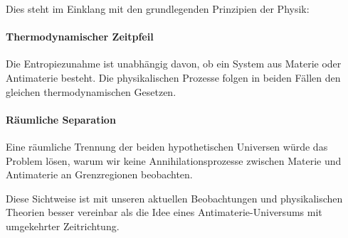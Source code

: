 \documentclass{article}
\begin{document}
	Dies steht im Einklang mit den grundlegenden Prinzipien der Physik:
	
	\paragraph{Thermodynamischer Zeitpfeil}
	Die Entropiezunahme ist unabhängig davon, ob ein System aus Materie oder Antimaterie besteht. Die physikalischen Prozesse folgen in beiden Fällen den gleichen thermodynamischen Gesetzen.
	
	\paragraph{Räumliche Separation}
	Eine räumliche Trennung der beiden hypothetischen Universen würde das Problem lösen, warum wir keine Annihilationsprozesse zwischen Materie und Antimaterie an Grenzregionen beobachten.
	
	Diese Sichtweise ist mit unseren aktuellen Beobachtungen und physikalischen Theorien besser vereinbar als die Idee eines Antimaterie-Universums mit umgekehrter Zeitrichtung.
	
\end{document}
